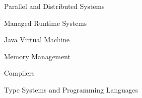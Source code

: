 
\begin{minipage}[t]{.33\linewidth}
  \begin{cvitems}
    \item Parallel and Distributed Systems
    \item Managed Runtime Systems
  \end{cvitems}
\end{minipage}%
%
\hspace{20pt}
%
\begin{minipage}[t]{.33\linewidth}
  \begin{cvitems}
    \item Java Virtual Machine
    \item Memory Management
  \end{cvitems}
\end{minipage}%
%
\hspace{20pt}
%
\begin{minipage}[t]{.33\linewidth}
  \begin{cvitems}
    \item Compilers
    \item Type Systems and
	 Programming Languages
  \end{cvitems}
\end{minipage}%
%

\vspace{15pt}
